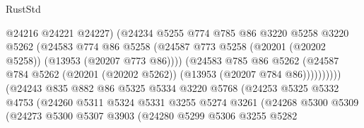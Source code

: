\begin{lexlean}{RustStd}
\begin{coremodule}
                                      @24216
                                      @24221
                                      @24227)
                                    (@24234
                                      @5255
                                      @774
                                      @785
                                      @86
                                      @3220
                                      @5258
                                      @3220
                                      @5262
                                      (@24583
                                        @774
                                        @86
                                        @5258
                                        (@24587
                                          @773
                                          @5258
                                          (@20201 (@20202 @5258))
                                          (@13953 (@20207 @773 @86))))
                                      (@24583
                                        @785
                                        @86
                                        @5262
                                        (@24587
                                          @784
                                          @5262
                                          (@20201 (@20202 @5262))
                                          (@13953 (@20207 @784 @86))))))))))
                          (@24243
                            @835
                            @882
                            @86
                            @5325
                            @5334
                            @3220
                            @5768
                            (@24253
                              @5325
                              @5332
                              @4753
                              (@24260
                                @5311
                                @5324
                                @5331
                                @3255
                                @5274
                                @3261
                                (@24268
                                  @5300
                                  @5309
                                  (@24273
                                    @5300
                                    @5307
                                    @3903
                                    (@24280
                                      @5299
                                      @5306
                                      @3255
                                      @5282

\end{coremodule}
\end{lexlean}
